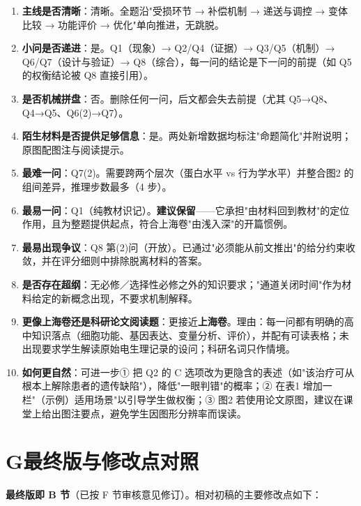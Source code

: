 \documentclass[UTF8,a4paper,11pt]{ctexart}
\begin{document}
\begin{enumerate}[leftmargin=1.8em,itemsep=3pt]
\item \textbf{主线是否清晰}：清晰。全题沿"受损环节 → 补偿机制 → 递送与调控 → 变体比较 → 功能评价 → 优化"单向推进，无跳脱。
\item \textbf{小问是否递进}：是。Q1（现象）→ Q2/Q4（证据）→ Q3/Q5（机制）→ Q6/Q7（设计与验证）→ Q8（综合），每一问的结论是下一问的前提（如 Q5 的权衡结论被 Q8 直接引用）。
\item \textbf{是否机械拼盘}：否。删除任何一问，后文都会失去前提（尤其 Q5→Q8、Q4→Q5、Q6(2)→Q7）。
\item \textbf{陌生材料是否提供足够信息}：是。两处新增数据均标注"命题简化"并附说明；原图配图注与阅读提示。
\item \textbf{最难一问}：Q7(2)。需要跨两个层次（蛋白水平 vs 行为学水平）并整合图2 的组间差异，推理步数最多（4 步）。
\item \textbf{最易一问}：Q1（纯教材识记）。\textbf{建议保留}——它承担"由材料回到教材"的定位作用，且为整题提供起点，符合上海卷"由浅入深"的开篇惯例。
\item \textbf{最易出现争议}：Q8 第(2)问（开放）。已通过"必须能从前文推出"的给分约束收敛，并在评分细则中排除脱离材料的答案。
\item \textbf{是否存在超纲}：无必修／选择性必修之外的知识要求；"通道关闭时间"作为材料给定的新概念出现，不要求机制解释。
\item \textbf{更像上海卷还是科研论文阅读题}：更接近\textbf{上海卷}。理由：每一问都有明确的高中知识落点（细胞功能、基因表达、变量分析、评价），并配有可读表格；未出现要求学生解读原始电生理记录的设问；科研名词只作情境。
\item \textbf{如何更自然}：可进一步① 把 Q2 的 C 选项改为更隐含的表述（如"该治疗可从根本上解除患者的遗传缺陷"），降低"一眼判错"的概率；② 在表1 增加一栏"（示例）适用场景"以引导学生做权衡；③ 图2 若使用论文原图，建议在课堂上给出图注要点，避免学生因图形分辨率而误读。
\end{enumerate}

\section{G\quad 最终版与修改点对照}

\noindent\textbf{最终版即 B 节}（已按 F 节审核意见修订）。相对初稿的主要修改点如下：
\end{document}
